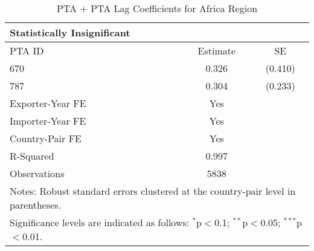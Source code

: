 \begin{table}[htbp]
    \centering
    \caption{PTA + PTA Lag Coefficients for Africa Region}
    \label{tab:pta_africa}
    \begin{adjustbox}{max width=\textwidth}
    \begin{tabular}{lcc}
    \hline
    \textbf{Statistically Insignificant} &  &  \\
    \hline
    PTA ID & Estimate & SE \\
    \hline
    670 & 0.326 & (0.410) \\
    787 & 0.304 & (0.233) \\
    \hline
    Exporter-Year FE & Yes \\
    Importer-Year FE & Yes \\
    Country-Pair FE & Yes \\
    R-Squared & 0.997 \\
    Observations & 5838 \\
    \hline
    \multicolumn{3}{l}{\footnotesize{Notes: Robust standard errors clustered at the country-pair level in parentheses.}} \\
    \multicolumn{3}{l}{\footnotesize{Significance levels are indicated as follows: $^{\ast}$p$<$0.1; $^{\ast\ast}$p$<$0.05; $^{\ast\ast\ast}$p$<$0.01.}} \\
    \end{tabular}
    \end{adjustbox}
\end{table}
